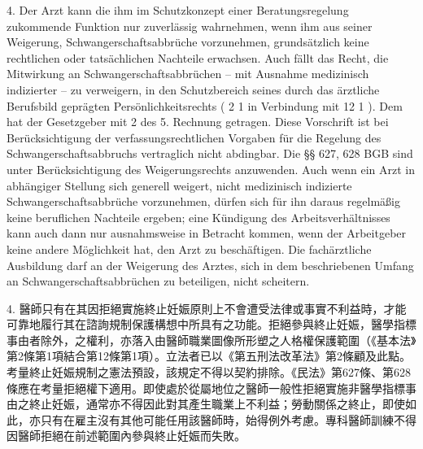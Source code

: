 \documentclass[12pt]{article}
\begin{document}
\begin{sourcepara}[title={原文D.147}]
4. Der Arzt kann die ihm im Schutzkonzept einer Beratungsregelung zukommende Funktion nur zuverlässig wahrnehmen, wenn ihm aus seiner Weigerung, Schwangerschaftsabbrüche vorzunehmen, grundsätzlich keine rechtlichen oder tatsächlichen Nachteile erwachsen. Auch fällt das Recht, die Mitwirkung an Schwangerschaftsabbrüchen -- mit Ausnahme medizinisch indizierter -- zu verweigern, in den Schutzbereich seines durch das ärztliche Berufsbild geprägten Persönlichkeitsrechts (\abbrArt{} 2 \abbrAbs{} 1 in Verbindung mit \abbrArt{} 12 \abbrAbs{} 1 \abbrGG{}\ggfnArtTwelveOneDE{}). Dem hat der Gesetzgeber mit \abbrArt{} 2 des 5. \abbrStrRG{} Rechnung getragen. Diese Vorschrift ist bei Berücksichtigung der verfassungsrechtlichen Vorgaben für die Regelung des Schwangerschaftsabbruchs vertraglich nicht abdingbar. Die §§ 627, 628 BGB sind unter Berücksichtigung des Weigerungsrechts anzuwenden. Auch wenn ein Arzt in abhängiger Stellung sich generell weigert, nicht medizinisch indizierte Schwangerschaftsabbrüche vorzunehmen, dürfen sich für ihn daraus regelmäßig keine beruflichen Nachteile ergeben; eine Kündigung des Arbeitsverhältnisses kann auch dann nur ausnahmsweise in Betracht kommen, wenn der Arbeitgeber keine andere Möglichkeit hat, den Arzt zu beschäftigen. Die fachärztliche Ausbildung darf an der Weigerung des Arztes, sich in dem beschriebenen Umfang an Schwangerschaftsabbrüchen zu beteiligen, nicht scheitern.
\end{sourcepara}
\begin{transpara}
4. 醫師只有在其因拒絕實施終止妊娠原則上不會遭受法律或事實不利益時，才能可靠地履行其在諮詢規制保護構想中所具有之功能。拒絕參與終止妊娠，醫學指標事由者除外，之權利，亦落入由醫師職業圖像所形塑之人格權保護範圍（《基本法》第2條第1項\ggfnArtTwoOneZH{}結合第12條第1項\ggfnArtTwelveOneZH{}）。立法者已以《第五刑法改革法》第2條顧及此點。考量終止妊娠規制之憲法預設，該規定不得以契約排除。《民法》第627條、第628條應在考量拒絕權下適用。即使處於從屬地位之醫師一般性拒絕實施非醫學指標事由之終止妊娠，通常亦不得因此對其產生職業上不利益；勞動關係之終止，即使如此，亦只有在雇主沒有其他可能任用該醫師時，始得例外考慮。專科醫師訓練不得因醫師拒絕在前述範圍內參與終止妊娠而失敗。
\end{transpara}
\end{document}
